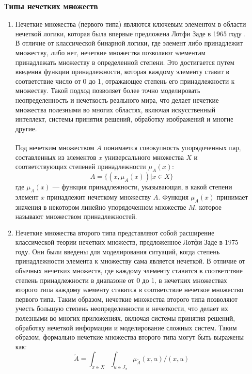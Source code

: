 \documentclass{article}
\begin{document}
    \subsubsection{Типы нечетких множеств}
    \begin{enumerate}
        \item Нечеткие множества (первого типа) являются ключевым элементом в области нечеткой логики, которая была впервые предложена Лотфи Заде в 1965 году \cite{litlink21}. В отличие от классической бинарной логики, где элемент либо принадлежит множеству, либо нет, нечеткие множества позволяют элементам принадлежать множеству в определенной степени. Это достигается путем введения функции принадлежности, которая каждому элементу ставит в соответствие число от 0 до 1, отражающее степень его принадлежности к множеству. Такой подход позволяет более точно моделировать неопределенность и нечеткость реального мира, что делает нечеткие множества полезными во многих областях, включая искусственный интеллект, системы принятия решений, обработку изображений и многие другие.\\
        ~\\
        Под нечетким множеством $A$ понимается совокупность упорядоченных пар, составленных из элементов $x$ универсального множества $X$ и соответствующих степеней принадлежности $\mu_A(x)$:\\
        $$A=\{(x, \mu_A(x)) | x \in X\}$$
        где $\mu_A(x)$ — функция принадлежности, указывающая, в какой степени элемент $x$ принадлежит нечеткому множеству $A$. Функция $\mu_A(x)$ принимает значения в некотором линейно упорядоченном множестве $M$, которое называют множеством принадлежностей.
        \item Нечеткие множества второго типа представляют собой расширение классической теории нечетких множеств, предложенное Лотфи Заде в 1975 году. Они были введены для моделирования ситуаций, когда степень принадлежности элемента к множеству сама является нечеткой. В отличие от обычных нечетких множеств, где каждому элементу ставится в соответствие степень принадлежности в диапазоне от 0 до 1, в нечетких множествах второго типа каждому элементу ставится в соответствие нечеткое множество первого типа. Таким образом, нечеткие множества второго типа позволяют учесть большую степень неопределенности и нечеткости, что делает их полезными во многих приложениях, включая системы принятия решений, обработку нечеткой информации и моделирование сложных систем. Таким образом, формально нечеткие множества второго типа могут быть выражены как:
        $$\tilde{A}=\int_{x\in X}\int_{u\in J_{x}} \mu_{\tilde{A}}(x,u) / (x,u)$$

\end{enumerate}
\end{document}
